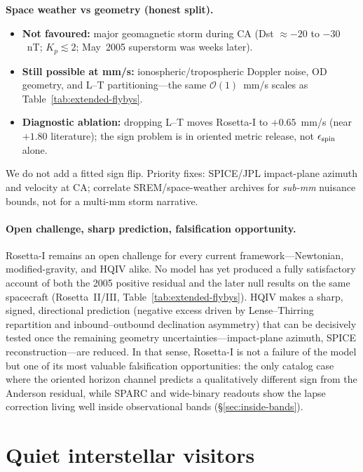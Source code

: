 \documentclass[11pt]{amsart}
\begin{document}
\textbf{Space weather vs geometry (honest split).}
\begin{itemize}[leftmargin=2em]
\item \textbf{Not favoured:} major geomagnetic storm during CA (Dst $\approx -20$ to $-30$~nT;
  $K_p\lesssim 2$; May~2005 superstorm was weeks later).
\item \textbf{Still possible at mm/s:} ionospheric/tropospheric Doppler noise, OD geometry,
  and L--T partitioning---the same $\mathcal{O}(1)$~mm/s scales as Table~\ref{tab:extended-flybys}.
\item \textbf{Diagnostic ablation:} dropping L--T moves Rosetta-I to $+0.65$~mm/s (near
  $+1.80$ literature); the sign problem is in oriented metric release, not $\epsilon_{\rm spin}$
  alone.
\end{itemize}
We do not add a fitted sign flip. Priority fixes: SPICE/JPL impact-plane azimuth and
velocity at CA; correlate SREM/space-weather archives for \emph{sub-mm} nuisance bounds, not
for a multi-mm storm narrative.

\paragraph{Open challenge, sharp prediction, falsification opportunity.}
Rosetta-I remains an open challenge for every current framework---Newtonian,
modified-gravity, and HQIV alike. No model has yet produced a fully satisfactory account
of both the 2005 positive residual and the later null results on the same spacecraft
(Rosetta~II/III, Table~\ref{tab:extended-flybys}). HQIV makes a sharp, signed, directional
prediction (negative excess driven by Lense--Thirring repartition and inbound--outbound
declination asymmetry) that can be decisively tested once the remaining geometry
uncertainties---impact-plane azimuth, SPICE reconstruction---are reduced. In that sense,
Rosetta-I is not a failure of the model but one of its most valuable falsification
opportunities: the only catalog case where the oriented horizon channel predicts a
qualitatively different sign from the Anderson residual, while SPARC and wide-binary
readouts show the lapse correction living well inside observational bands
(\S\ref{sec:inside-bands}).

\section{Quiet interstellar visitors}
\end{document}
